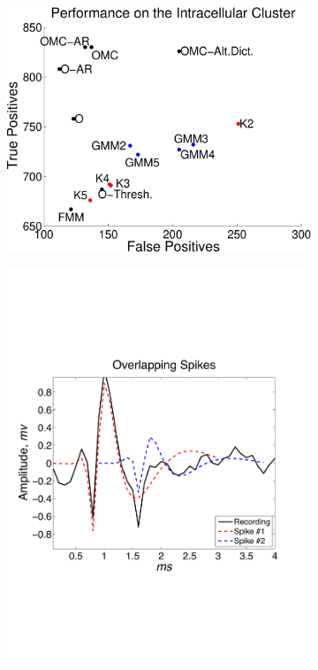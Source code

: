 \begin{center}
\begin{figure}
\begin{subfigure}[b]{.49\textwidth}
\centering
\includegraphics[width=\textwidth]{../figs/truefalsepositive.pdf}
\caption{}
\label{hc1res}
\end{subfigure}
\begin{subfigure}[b]{.49\textwidth}
\includegraphics[width=\textwidth]{../figs/alloverlappingspikes/olspike3}
\caption{}
\label{overlapping}
\end{subfigure}




\end{figure}
\end{center}
